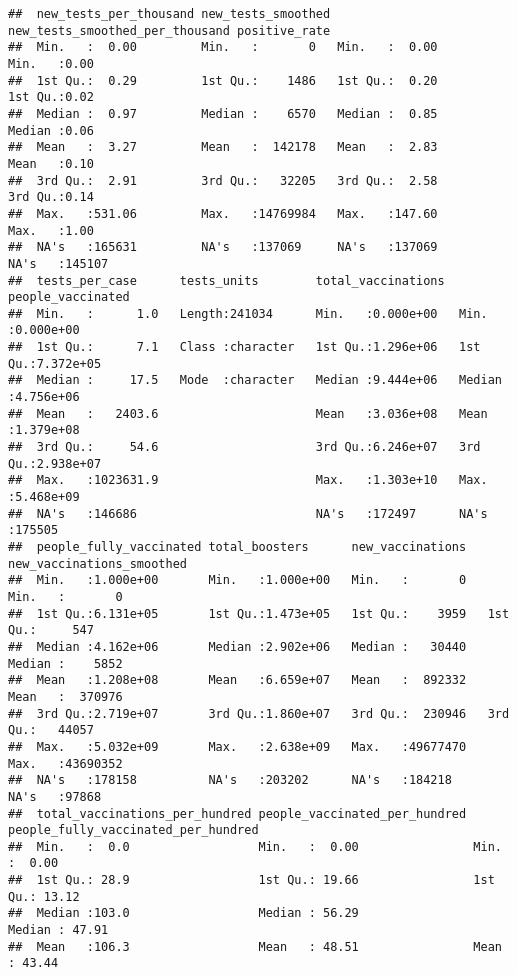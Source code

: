 \documentclass[
]{article}
\begin{document}
\begin{verbatim}
##  new_tests_per_thousand new_tests_smoothed new_tests_smoothed_per_thousand positive_rate   
##  Min.   :  0.00         Min.   :       0   Min.   :  0.00                  Min.   :0.00    
##  1st Qu.:  0.29         1st Qu.:    1486   1st Qu.:  0.20                  1st Qu.:0.02    
##  Median :  0.97         Median :    6570   Median :  0.85                  Median :0.06    
##  Mean   :  3.27         Mean   :  142178   Mean   :  2.83                  Mean   :0.10    
##  3rd Qu.:  2.91         3rd Qu.:   32205   3rd Qu.:  2.58                  3rd Qu.:0.14    
##  Max.   :531.06         Max.   :14769984   Max.   :147.60                  Max.   :1.00    
##  NA's   :165631         NA's   :137069     NA's   :137069                  NA's   :145107  
##  tests_per_case      tests_units        total_vaccinations  people_vaccinated  
##  Min.   :      1.0   Length:241034      Min.   :0.000e+00   Min.   :0.000e+00  
##  1st Qu.:      7.1   Class :character   1st Qu.:1.296e+06   1st Qu.:7.372e+05  
##  Median :     17.5   Mode  :character   Median :9.444e+06   Median :4.756e+06  
##  Mean   :   2403.6                      Mean   :3.036e+08   Mean   :1.379e+08  
##  3rd Qu.:     54.6                      3rd Qu.:6.246e+07   3rd Qu.:2.938e+07  
##  Max.   :1023631.9                      Max.   :1.303e+10   Max.   :5.468e+09  
##  NA's   :146686                         NA's   :172497      NA's   :175505     
##  people_fully_vaccinated total_boosters      new_vaccinations   new_vaccinations_smoothed
##  Min.   :1.000e+00       Min.   :1.000e+00   Min.   :       0   Min.   :       0         
##  1st Qu.:6.131e+05       1st Qu.:1.473e+05   1st Qu.:    3959   1st Qu.:     547         
##  Median :4.162e+06       Median :2.902e+06   Median :   30440   Median :    5852         
##  Mean   :1.208e+08       Mean   :6.659e+07   Mean   :  892332   Mean   :  370976         
##  3rd Qu.:2.719e+07       3rd Qu.:1.860e+07   3rd Qu.:  230946   3rd Qu.:   44057         
##  Max.   :5.032e+09       Max.   :2.638e+09   Max.   :49677470   Max.   :43690352         
##  NA's   :178158          NA's   :203202      NA's   :184218     NA's   :97868            
##  total_vaccinations_per_hundred people_vaccinated_per_hundred people_fully_vaccinated_per_hundred
##  Min.   :  0.0                  Min.   :  0.00                Min.   :  0.00                     
##  1st Qu.: 28.9                  1st Qu.: 19.66                1st Qu.: 13.12                     
##  Median :103.0                  Median : 56.29                Median : 47.91                     
##  Mean   :106.3                  Mean   : 48.51                Mean   : 43.44                     

\end{verbatim}
\end{document}
